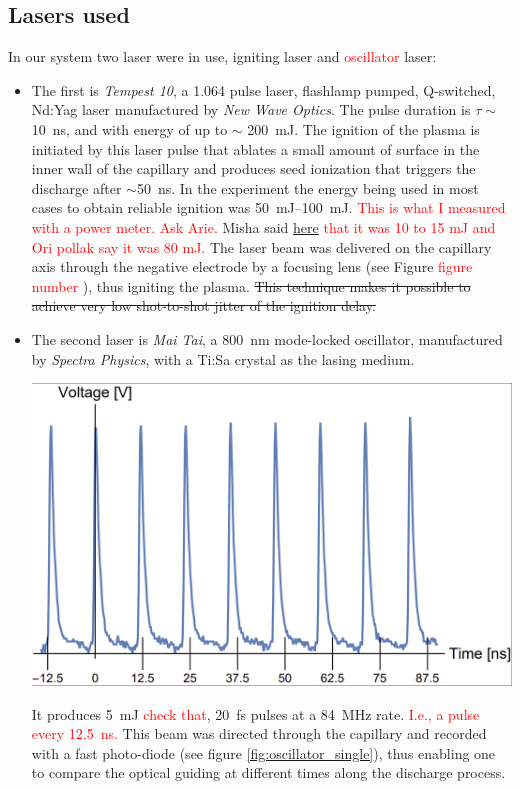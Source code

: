 \documentclass[justified,nofonts,nobib]{tufte-book}
\begin{document}
\subsection{Lasers used}\label{ssec:lasers}
In our system two laser were in use, igniting laser and \textcolor{red}{oscillator} laser:
\begin{itemize}
\item The first is \textit{Tempest 10}, a \SI{1.064}{\mu} pulse laser, flashlamp pumped, Q-switched, Nd:Yag laser manufactured by \textit{New Wave Optics}. The pulse duration is $\tau \sim$ \SI{10}{\ns}, and with energy of up to $\sim$ \SI{200}{\mJ}. The ignition of the plasma is initiated by this laser pulse that ablates a small amount of surface in the inner wall of the capillary and produces seed ionization that triggers the discharge after $\sim$\SI{50}{\ns}. In the experiment the energy being used in most cases to obtain reliable ignition was \SIrange{50}{100}{\mJ}. \textcolor{red}{This is what I measured with a power meter. Ask Arie.} Misha said \href{https://aip.scitation.org/doi/full/10.1063/1.2149183}{here} \textcolor{red}{that it was 10 to 15 mJ and Ori pollak say it was 80 mJ.} The laser beam was delivered on the capillary axis through the negative electrode by a focusing lens (see Figure \textcolor{red}{figure number }), thus igniting the plasma. \st{This technique makes it possible to achieve very low shot-to-shot jitter of the ignition delay.}
\item The second laser is \textit{Mai Tai}, a \SI{800}{\nm} mode-locked oscillator, manufactured by \textit{Spectra Physics}, with a Ti:Sa crystal as the lasing medium.
\begin{marginfigure}
    \includegraphics[width=\marginparwidth]{figures/oscillator_single.PNG}
    \label{fig:oscillator_single}
    \caption{Oscillator laser, \SI{84}{\MHz} temporal beam profile.}
\end{marginfigure}
It produces \SI{5}{\mJ} \textcolor{red}{check that}, \SI{20}{\fs} pulses at a \SI{84}{\MHz} rate. \textcolor{red}{I.e., a pulse every \SI{12.5}{\ns}.} This beam was directed through the capillary and recorded with a fast photo-diode (see figure \ref{fig:oscillator_single}), thus enabling one to compare the optical guiding at different times along the discharge process.
\end{itemize}
\end{document}
